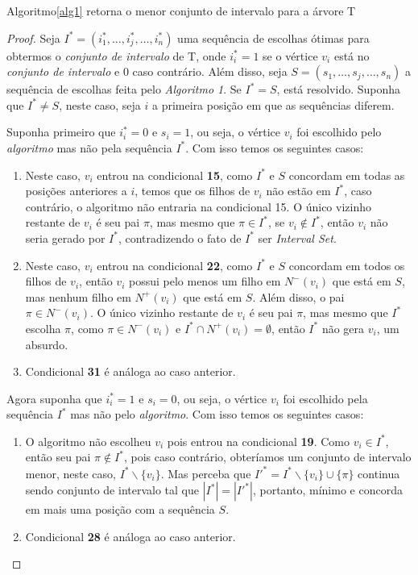 \begin{theorem}
  Algoritmo\ref{alg1} retorna o menor conjunto de intervalo para a árvore T
  \begin{proof}
  Seja $I^* = (i^*_1, \ldots, i^*_j, \ldots, i^*_n)$ uma sequência de escolhas ótimas para obtermos o \emph{conjunto de intervalo} de T, onde $i^*_i = 1$ se o vértice $v_i$ está no \emph{conjunto de intervalo} e $0$ caso contrário. Além disso, seja $S = (s_1, \ldots, s_j, \ldots, s_n)$ a sequência de escolhas feita pelo \emph{Algoritmo 1}. Se $I^*=S$, está resolvido. Suponha que $I^* \neq S$, neste caso, seja $i$ a primeira posição em que as sequências diferem.

  Suponha primeiro que $i^*_i = 0$ e $s_i = 1$, ou seja, o vértice $v_i$ foi escolhido pelo \emph{algoritmo} mas não pela sequência $I^*$. Com isso temos os seguintes casos:

  \begin{enumerate}
    \item Neste caso, $v_i$ entrou na condicional \textbf{15}, como $I^*$ e $S$ concordam em todas as posições anteriores a $i$, temos que os filhos de $v_i$ não estão em $I^*$, caso contrário, o algoritmo não entraria na condicional 15. O único vizinho restante de $v_i$ é seu pai $\pi$, mas mesmo que $\pi \in I^*$, se $v_i \notin I^*$, então $v_i$ não seria gerado por $I^*$, contradizendo o fato de $I^*$ ser \emph{Interval Set}.
    \item Neste caso, $v_i$ entrou na condicional \textbf{22}, como $I^*$ e $S$ concordam em todos os filhos de $v_i$, então $v_i$ possui pelo menos um filho em $N^-(v_i)$ que está em $S$, mas nenhum filho em $N^+(v_i)$ que está em $S$. Além disso, o pai $\pi \in N^-(v_i)$. O único vizinho restante de $v_i$ é seu pai $\pi$, mas mesmo que $I^*$ escolha $\pi$, como $\pi \in N^-(v_i)$ e $I^*\cap N^+(v_i) = \emptyset$, então $I^*$ não gera $v_i$, um absurdo.
    \item Condicional \textbf{31} é análoga ao caso anterior.
  \end{enumerate}

  Agora suponha que $i^*_i=1$ e $s_i = 0$, ou seja, o vértice $v_i$ foi escolhido pela sequência $I^*$ mas não pelo \emph{algoritmo}. Com isso temos os seguintes casos:

  \begin{enumerate}
    \item O algoritmo não escolheu $v_i$ pois entrou na condicional \textbf{19}. Como $v_i \in I^*$, então seu pai $\pi \notin I^*$, pois caso contrário, obteríamos um conjunto de intervalo menor, neste caso, $I^*\backslash \{v_i\}$. Mas perceba que $I'^* = I^*\backslash \{v_i\} \cup \{\pi\}$ continua sendo conjunto de intervalo tal que $|I^*| = |I'^*|$, portanto, mínimo e concorda em mais uma posição com a sequência $S$.
    \item Condicional \textbf{28} é análoga ao caso anterior.
  \end{enumerate}
  \end{proof}
\end{theorem}

